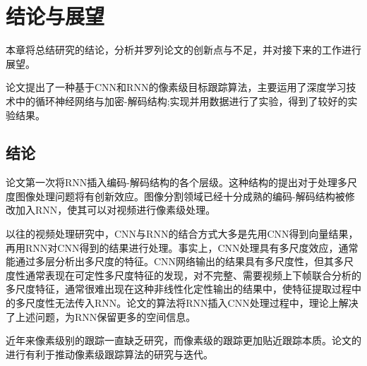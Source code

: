 
\chapter{结论与展望}
本章将总结研究的结论，分析并罗列论文的创新点与不足，并对接下来的工作进行展望。
\par
论文提出了一种基于CNN和RNN的像素级目标跟踪算法，主要运用了深度学习技术中的循环神经网络与加密-解码结构;实现并用数据进行了实验，得到了较好的实验结果。
\section{结论}
论文第一次将RNN插入编码-解码结构的各个层级。这种结构的提出对于处理多尺度图像处理问题将有创新效应。图像分割领域已经十分成熟的编码-解码结构被修改加入RNN，使其可以对视频进行像素级处理。
\par
以往的视频处理研究中，CNN与RNN的结合方式大多是先用CNN得到向量结果，再用RNN对CNN得到的结果进行处理。事实上，CNN处理具有多尺度效应，通常能通过多层分析出多尺度的特征。CNN网络输出的结果具有多尺度性，但其多尺度性通常表现在可定性多尺度特征的发现，对不完整、需要视频上下帧联合分析的多尺度特征，通常很难出现在这种非线性化定性输出的结果中，使特征提取过程中的多尺度性无法传入RNN。论文的算法将RNN插入CNN处理过程中，理论上解决了上述问题，为RNN保留更多的空间信息。
\par
近年来像素级别的跟踪一直缺乏研究，而像素级的跟踪更加贴近跟踪本质。论文的进行有利于推动像素级跟踪算法的研究与迭代。

